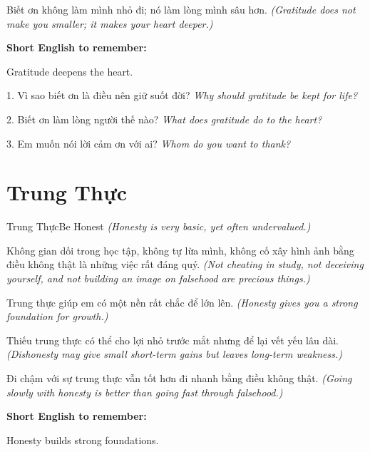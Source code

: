 \begin{baihoc}
Biết ơn không làm mình nhỏ đi; nó làm lòng mình sâu hơn.
\textit{(Gratitude does not make you smaller; it makes your heart deeper.)}
\end{baihoc}

\begin{ghinhoanh}
\textbf{Short English to remember:}

Gratitude deepens the heart.

\end{ghinhoanh}

\begin{tuhocnhanh}
1. Vì sao biết ơn là điều nên giữ suốt đời? \textit{Why should gratitude be kept for life?}

2. Biết ơn làm lòng người thế nào? \textit{What does gratitude do to the heart?}

3. Em muốn nói lời cảm ơn với ai? \textit{Whom do you want to thank?}
\end{tuhocnhanh}
\ngancach

\section{Trung Thực}
\begin{truyen}{Trung Thực}{Be Honest}
\textit{(Honesty is very basic, yet often undervalued.)}

Không gian dối trong học tập, không tự lừa mình, không cố xây hình ảnh bằng điều không thật là những việc rất đáng quý.
\textit{(Not cheating in study, not deceiving yourself, and not building an image on falsehood are precious things.)}

Trung thực giúp em có một nền rất chắc để lớn lên.
\textit{(Honesty gives you a strong foundation for growth.)}

Thiếu trung thực có thể cho lợi nhỏ trước mắt nhưng để lại vết yếu lâu dài.
\textit{(Dishonesty may give small short-term gains but leaves long-term weakness.)}
\end{truyen}

\begin{baihoc}
Đi chậm với sự trung thực vẫn tốt hơn đi nhanh bằng điều không thật.
\textit{(Going slowly with honesty is better than going fast through falsehood.)}
\end{baihoc}

\begin{ghinhoanh}
\textbf{Short English to remember:}

Honesty builds strong foundations.

\end{ghinhoanh}

